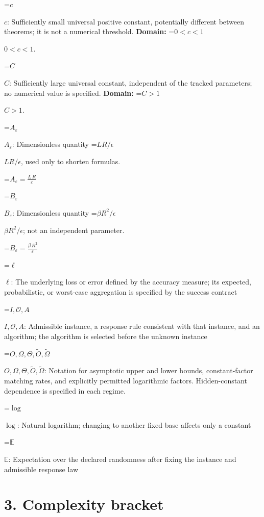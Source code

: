 \documentclass[10pt,a4paper]{article}
\newcommand{\AtlasMath}[1]{\par\begingroup\centering\setbox0=\hbox{$\displaystyle #1$}\ifdim\wd0>1.4\linewidth\typeout{ATLAS WIDE FORMULA: \the\wd0}\fi\ifdim\wd0>\linewidth\resizebox{\linewidth}{!}{\box0}\else\box0\fi\par\endgroup}
\newcommand{\AtlasInlineMath}[1]{\begingroup\setbox0=\hbox{$#1$}\ifdim\wd0>.4\linewidth\endgroup\AtlasMath{#1}\else\endgroup$#1$\fi}
\begin{document}
\AtlasInlineMath{c}: Sufficiently small universal positive constant, potentially different between theorems; it is not a numerical threshold. \textbf{Domain:} \AtlasInlineMath{0<c<1}.



\AtlasInlineMath{C}: Sufficiently large universal constant, independent of the tracked parameters; no numerical value is specified. \textbf{Domain:} \AtlasInlineMath{C>1}.



\AtlasInlineMath{A_\varepsilon}: Dimensionless quantity \AtlasInlineMath{LR/\epsilon}, used only to shorten formulas.




\AtlasMath{A_\varepsilon=\frac{L\,R}{\varepsilon}}




\AtlasInlineMath{B_\varepsilon}: Dimensionless quantity \AtlasInlineMath{\beta R^2/\epsilon}; not an independent parameter.




\AtlasMath{B_\varepsilon=\frac{\beta\,{R}^{2}}{\varepsilon}}




\AtlasInlineMath{\ell}: The underlying loss or error defined by the accuracy measure; its expected, probabilistic, or worst-case aggregation is specified by the success contract



\AtlasInlineMath{I,\mathcal{O},A}: Admissible instance, a response rule consistent with that instance, and an algorithm; the algorithm is selected before the unknown instance



\AtlasInlineMath{O,\Omega,\Theta,\widetilde{O},\widetilde\Omega}: Notation for asymptotic upper and lower bounds, constant-factor matching rates, and explicitly permitted logarithmic factors. Hidden-constant dependence is specified in each regime.



\AtlasInlineMath{\log}: Natural logarithm; changing to another fixed base affects only a constant



\AtlasInlineMath{\mathbb{E}}: Expectation over the declared randomness after fixing the instance and admissible response law



\section{3. Complexity bracket}
\end{document}
